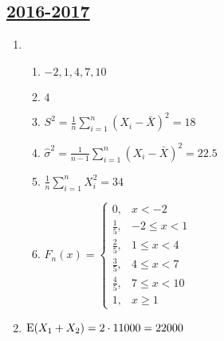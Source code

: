 \subsection[2016-2017]{\hyperref[sec:kr_03_2016_2017]{2016-2017}}
\label{sec:sol_kr_03_2016_2017}


\begin{enumerate}
\item
\begin{enumerate}
\item $-2, 1, 4, 7, 10$
\item $4$
\item $S^2 = \frac{1}{n} \sum_{i=1}^n (X_i - \bar{X})^2 = 18$
\item $\hat\sigma^2 = \frac{1}{n-1} \sum_{i=1}^n (X_i - \bar{X})^2 = 22.5$
\item $\frac{1}{n} \sum_{i=1}^n X_i^2 = 34$
\item $F_n(x) = \begin{cases}
0, & x < -2 \\
\frac{1}{5}, & -2 \leq x < 1 \\
\frac{2}{5}, & 1 \leq x < 4 \\
\frac{3}{5}, & 4 \leq x < 7 \\
\frac{4}{5}, & 7 \leq x < 10 \\
1, & x \geq 1
\end{cases}$
\end{enumerate}
\item $\operatorname{E}(X_1 + X_2) = 2 \cdot 11000 = 22000$


\end{enumerate}
